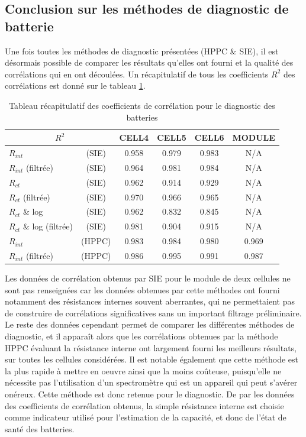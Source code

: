 \subsection{Conclusion sur les méthodes de diagnostic de batterie}
Une fois toutes les méthodes de diagnostic présentées (HPPC \& SIE), il est désormais possible de comparer les résultats qu'elles ont fourni et la qualité des corrélations qui en ont découlées. Un récapitulatif de tous les coefficients $R^2$ des corrélations est donné sur le tableau \ref{tab_corr}. 
\begin{table}[h!]
    \caption{Tableau récapitulatif des coefficients de corrélation pour le diagnostic des batteries \vspace{0.02cm}}
    \centering
    \begin{tabular}{|lc||c|c|c|c|}
    \hline
        \multicolumn{2}{|c||}{$R^2$} & CELL4 & CELL5 & CELL6 & MODULE \\ \hline \hline 
        $R_{int}$ &(SIE)& 0.958 & 0.979 & 0.983 & N/A \\ \hline
        $R_{int}$ (filtrée)&(SIE)& 0.964 & 0.981 & 0.984 & N/A \\ \hline
        $R_{ct}$ &(SIE)& 0.962 & 0.914 & 0.929 & N/A\\ \hline
        $R_{ct}$ (filtrée)&(SIE)& 0.970 & 0.966 & 0.965 & N/A\\ \hline
        $R_{ct}$ \& log &(SIE)& 0.962 & 0.832 & 0.845 & N/A \\ \hline
        $R_{ct}$ \& log (filtrée) &(SIE)& 0.981 & 0.904 & 0.915 & N/A \\ \hline
        $R_{int}$ &(HPPC)& 0.983 & 0.984 & 0.980 & 0.969 \\ \hline
        $R_{int}$ (filtrée)&(HPPC)& 0.986 & 0.995 & 0.991 & 0.987 \\ \hline
    \end{tabular}
    \label{tab_corr}
\end{table}
\FloatBarrier
Les données de corrélation obtenus par SIE pour le module de deux cellules ne sont pas renseignées car les données obtenues par cette méthodes ont fourni notamment des résistances internes souvent aberrantes, qui ne permettaient pas de construire de corrélations significatives sans un important filtrage préliminaire. Le reste des données cependant permet de comparer les différentes méthodes de diagnostic, et il apparaît alors que les corrélations obtenues par la méthode HPPC évaluant la résistance interne ont largement fourni les meilleurs résultats, sur toutes les cellules considérées. Il est notable également que cette méthode est la plus rapide à mettre en oeuvre ainsi que la moins coûteuse, puisqu'elle ne nécessite pas l'utilisation d'un spectromètre qui est un appareil qui peut s'avérer onéreux. Cette méthode est donc retenue pour le diagnostic.
De par les données des coefficients de corrélation obtenus, la simple résistance interne est choisie comme indicateur utilisé pour l'estimation de la capacité, et donc de l'état de santé des batteries.

